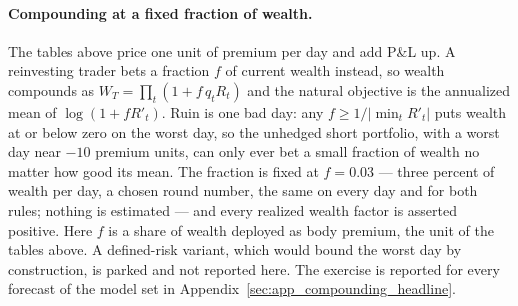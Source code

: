 \paragraph{Compounding at a fixed fraction of wealth.} The tables above
price one unit of premium per day and add P\&L up. A reinvesting
trader bets a fraction $f$ of current wealth instead, so wealth
compounds as $W_T=\prod_t(1+f\,q_t R_t)$ and the natural objective
is the annualized mean of $\log(1+f R'_t)$. Ruin is one bad day:
any $f \ge 1/|\min_t R'_t|$ puts wealth at or below zero on the worst
day, so the unhedged short portfolio, with a worst day near $-10$ premium
units, can only ever bet a small fraction of wealth no matter how
good its mean. The fraction is fixed at $f = 0.03$ --- three percent of
wealth per day, a chosen round number, the same on every day and for both
rules; nothing is estimated --- and every realized wealth factor is
asserted positive. Here $f$ is a share of wealth deployed as body premium,
the unit of the tables above. A defined-risk variant, which would bound the
worst day by construction, is parked and not reported here.
The exercise is reported for every forecast of the model set in
Appendix~\ref{sec:app_compounding_headline}.

